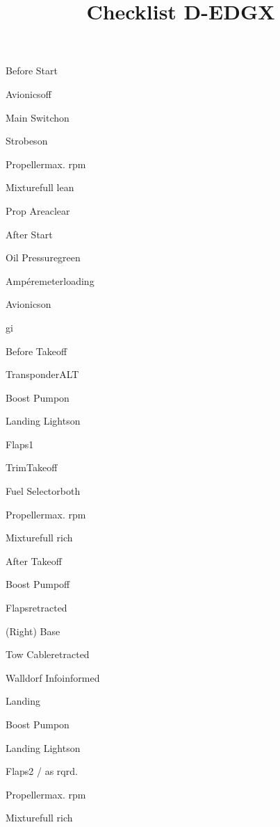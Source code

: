 \def\papersize{6}




\title{Checklist D-EDGX}

\begin{checklist}{Before Start}
  \item{Avionics}{off}
  \item{Main Switch}{on}
  \item{Strobes}{on}
  \item{Propeller}{max. rpm}
  \item{Mixture}{full lean}
  \item{Prop Area}{clear}
\end{checklist}

\begin{checklist}{After Start}
  \item{Oil Pressure}{green}
  \item{Ampéremeter}{loading}
  \item{Avionics}{on}
\end{checklist}gi

\begin{checklist}{Before Takeoff}
  \item{Transponder}{ALT}
  \item{Boost Pump}{on}
  \item{Landing Lights}{on}
  \item{Flaps}{1}
  \item{Trim}{Takeoff}
  \item{Fuel Selector}{both}
  \item{Propeller}{max. rpm}
  \item{Mixture}{full rich}
\end{checklist}

\begin{checklist}{After Takeoff}
  \item{Boost Pump}{off}
  \item{Flaps}{retracted}
\end{checklist}

\begin{checklist}{(Right) Base}
  \item{Tow Cable}{retracted}
  \item{Walldorf Info}{informed}
\end{checklist}

\begin{checklist}{Landing}
  \item{Boost Pump}{on}
  \item{Landing Lights}{on}
  \item{Flaps}{2 / as rqrd.}
  \item{Propeller}{max. rpm}
  \item{Mixture}{full rich}
\end{checklist}

